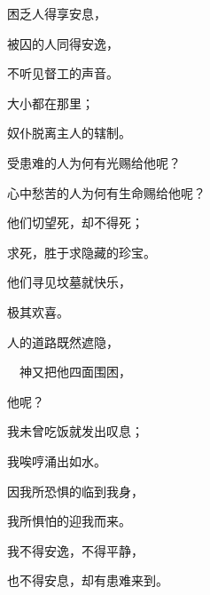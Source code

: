 {\par }{\Q 困乏人得享安息，
\par }{\Q {}被囚的人同得安逸，
\par }{\Q 不听见督工的声音。
\par }{\Q {}大小都在那里；
\par }{\Q 奴仆脱离主人的辖制。
\par }{\BB \par }{\Q {}受患难的人为何有光赐给他呢？
\par }{\Q 心中愁苦的人为何有生命赐给他呢？
\par }{\Q {}他们切望死，却不得死；
\par }{\Q 求死，胜于求隐藏的珍宝。
\par }{\Q {}他们寻见坟墓就快乐，
\par }{\Q 极其欢喜。
\par }{\Q {}人的道路既然遮隐，
\par }{\Q 　神又把他四面围困，
\par }{他呢？
\par }{\Q {}我未曾吃饭就发出叹息；
\par }{\Q 我唉哼{}涌出如水。
\par }{\Q {}因我所恐惧的临到我身，
\par }{\Q 我所惧怕的迎我而来。
\par }{\Q {}我不得安逸，不得平静，
\par }{\Q 也不得安息，却有患难来到。

}

